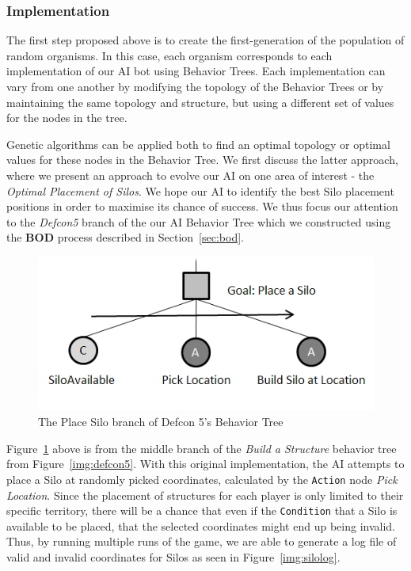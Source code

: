         \subsubsection{Implementation}
        
        The first step proposed above is to create the first-generation of the population of random organisms. In this case, each organism corresponds to each implementation of our AI bot using Behavior Trees. Each implementation can vary from one another by modifying the topology of the Behavior Trees or by maintaining the same topology and structure, but using a different set of values for the nodes in the tree. %
        
        Genetic algorithms can be applied both to find an optimal topology or optimal values for these nodes in the Behavior Tree. We first discuss the latter approach, where we present an approach to evolve our AI on one area of interest - the \emph{Optimal Placement of Silos}. We hope our AI to identify the best Silo placement positions in order to maximise its chance of success. We thus focus our attention to the \emph{Defcon5} branch of the our AI Behavior Tree which we constructed using the \textbf{BOD} process described in Section~\ref{sec:bod}. 

        \begin{figure}[h]                
                \begin{center}
                \includegraphics[scale=0.6]{images/placesilos.png}
                \caption{The Place Silo branch of Defcon 5's Behavior Tree}
                \label{img:placesilos}
                \end{center}            
            \end{figure}
        
        Figure~\ref{img:placesilos} above is from the middle branch of the \emph{Build a Structure} behavior tree from Figure~\ref{img:defcon5}. With this original implementation, the AI attempts to place a Silo at randomly picked coordinates, calculated by the \texttt{Action} node \emph{Pick Location}. Since the placement of structures for each player is only limited to their specific territory, there will be a chance that even if the \texttt{Condition} that a Silo is available to be placed, that the selected coordinates might end up being invalid. Thus, by running multiple runs of the game, we are able to generate a log file of valid and invalid coordinates for Silos as seen in Figure~\ref{img:silolog}.
    
